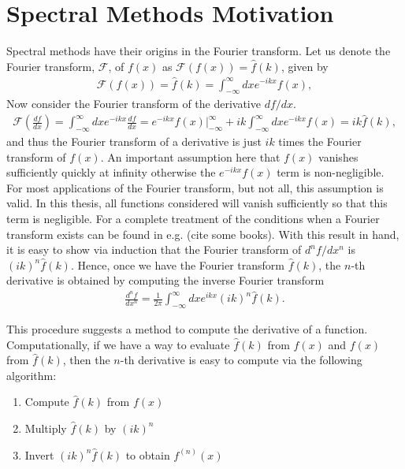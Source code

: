 \section{Spectral Methods Motivation}
Spectral methods have their origins in the Fourier transform. Let us denote the Fourier transform, $\mathcal{F}$, of $f(x)$ as $\mathcal{F}(f(x)) = \hat{f}(k)$, given by
\begin{align}
\mathcal{F}(f(x)) = \hat{f}(k) = \int_{-\infty}^{\infty}dxe^{-ikx}f(x)\label{fouriertransform},
\end{align}
Now consider the Fourier transform of the derivative $df/dx$. 
\begin{align}
\mathcal{F}\left(\frac{df}{dx}\right)= \int_{-\infty}^{\infty}dxe^{-ikx}\frac{df}{dx}=e^{-ikx}f(x)\bigg|_{-\infty}^{\infty} + ik\int_{-\infty}^{\infty}dxe^{-ikx}f(x)= ik\hat{f}(k),
\end{align}
and thus the Fourier transform of a derivative is just $ik$ times the Fourier transform of $f(x)$. An important assumption here that $f(x)$ vanishes sufficiently quickly at infinity otherwise the $e^{-ikx}f(x)$ term is non-negligible. For most applications of the Fourier transform, but not all,  this assumption is valid. In this thesis, all functions considered will vanish sufficiently so that this term is negligible. For a complete treatment of the conditions when a Fourier transform exists can be found in e.g. (cite some books). With this result in hand, it is easy to show via induction that the Fourier transform of $d^{n}f/dx^{n}$ is $(ik)^{n}\hat{f}(k)$. Hence, once we have the Fourier transform $\hat{f}(k)$, the $n$-th derivative is obtained by computing the inverse Fourier transform
\begin{align}
\frac{d^{n}f}{dx^{n}} = \frac{1}{2\pi} \int_{-\infty}^{\infty}dx e^{ikx}(ik)^{n}\hat{f}(k).\label{inversefouriertransform}
\end{align}

This procedure suggests a method to compute the derivative of a function. Computationally, if we have a way to evaluate $\hat{f}(k)$ from $f(x)$ and $f(x)$ from $\hat{f}(k)$, then the $n$-th derivative is easy to compute via the following algorithm:  
\begin{enumerate} 
\item Compute $\hat{f}(k)$ from $f(x)$
\item Multiply $\hat{f}(k)$ by $(ik)^{n}$ 
\item Invert $(ik)^{n}\hat{f}(k)$ to obtain $f^{(n)}(x)$
\end{enumerate}

